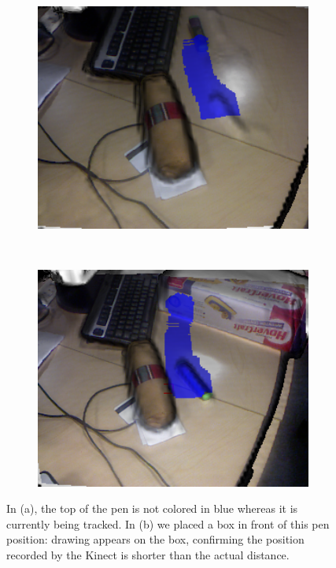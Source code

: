 \documentclass[12pt]{article}
\begin{document}
\begin{figure}[h]
  \centering
  \begin{subfigure}[t]{0.5\textwidth}
    \includegraphics[width=1\textwidth]{PenIssue1.png}
    \caption{}
  \end{subfigure}~
  \begin{subfigure}[t]{0.5\textwidth}
    \includegraphics[width=1\textwidth]{PenIssue2.png}
    \caption{}
    \end{subfigure}
  \caption{\label{fig:penissue}In (a), the top of the pen is not colored in blue whereas it is currently being tracked. In (b) we placed a box in front of this pen position: drawing appears on the box, confirming the position recorded by the Kinect is shorter than the actual distance.}
  \par
\end{figure}
\end{document}
